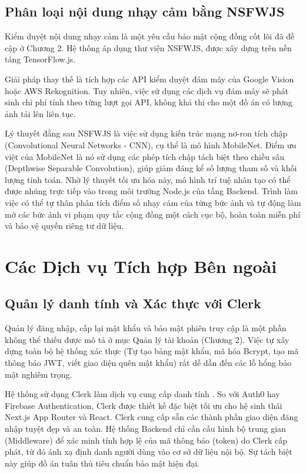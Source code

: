 \subsection{Phân loại nội dung nhạy cảm bằng NSFWJS}

Kiểm duyệt nội dung nhạy cảm là một yêu cầu bảo mật cộng đồng cốt lõi đã đề cập ở Chương 2. Hệ thống áp dụng thư viện NSFWJS, được xây dựng trên nền tảng TensorFlow.js.

Giải pháp thay thế là tích hợp các API kiểm duyệt đám mây của Google Vision hoặc AWS Rekognition. Tuy nhiên, việc sử dụng các dịch vụ đám mây sẽ phát sinh chi phí tính theo từng lượt gọi API, không khả thi cho một đồ án có lượng ảnh tải lên liên tục.

Lý thuyết đằng sau NSFWJS là việc sử dụng kiến trúc mạng nơ-ron tích chập (Convolutional Neural Networks - CNN), cụ thể là mô hình MobileNet. Điểm ưu việt của MobileNet là nó sử dụng các phép tích chập tách biệt theo chiều sâu (Depthwise Separable Convolution), giúp giảm đáng kể số lượng tham số và khối lượng tính toán. Nhờ lý thuyết tối ưu hóa này, mô hình trí tuệ nhân tạo có thể được nhúng trực tiếp vào trong môi trường Node.js của tầng Backend. Trình làm việc có thể tự thân phân tích điểm số nhạy cảm của từng bức ảnh và tự động làm mờ các bức ảnh vi phạm quy tắc cộng đồng một cách cục bộ, hoàn toàn miễn phí và bảo vệ quyền riêng tư dữ liệu.

\section{Các Dịch vụ Tích hợp Bên ngoài}

\subsection{Quản lý danh tính và Xác thực với Clerk}

Quản lý đăng nhập, cấp lại mật khẩu và bảo mật phiên truy cập là một phần không thể thiếu được mô tả ở mục Quản lý tài khoản (Chương 2). Việc tự xây dựng toàn bộ hệ thống xác thực (Tự tạo bảng mật khẩu, mã hóa Bcrypt, tạo mã thông báo JWT, viết giao diện quên mật khẩu) rất dễ dẫn đến các lỗ hổng bảo mật nghiêm trọng.

Hệ thống sử dụng Clerk làm dịch vụ cung cấp danh tính \cite{clerk}. So với Auth0 hay Firebase Authentication, Clerk được thiết kế đặc biệt tối ưu cho hệ sinh thái Next.js App Router và React. Clerk cung cấp sẵn các thành phần giao diện đăng nhập tuyệt đẹp và an toàn. Hệ thống Backend chỉ cần cấu hình bộ trung gian (Middleware) để xác minh tính hợp lệ của mã thông báo (token) do Clerk cấp phát, từ đó ánh xạ định danh người dùng vào cơ sở dữ liệu nội bộ. Sự tách biệt này giúp đồ án tuân thủ tiêu chuẩn bảo mật hiện đại.

